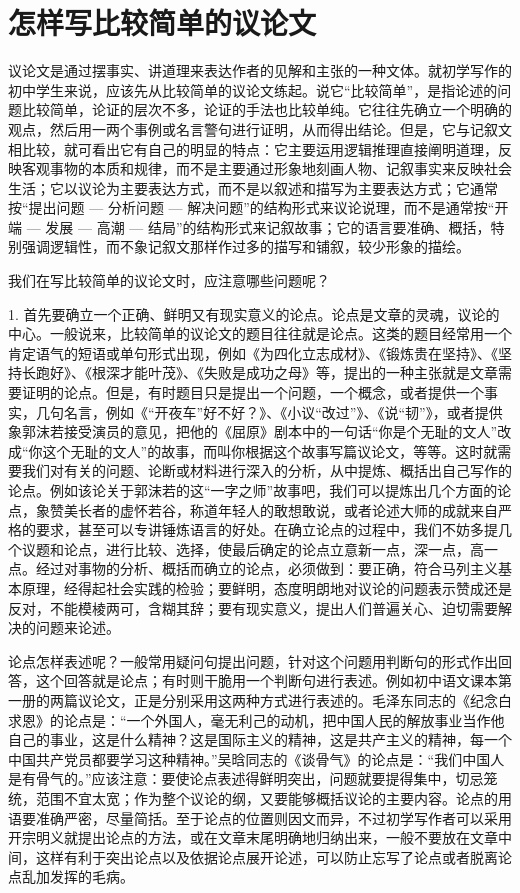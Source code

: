 \section{怎样写比较简单的议论文}

议论文是通过摆事实、讲道理来表达作者的见解和主张的一种文体。就初学写作的初中学生来说，应该先从比较简单的议论文练起。说它“比较简单”，是指论述的问题比较简单，论证的层次不多，论证的手法也比较单纯。它往往先确立一个明确的观点，然后用一两个事例或名言警句进行证明，从而得出结论。但是，它与记叙文相比较，就可看出它有自己的明显的特点：它主要运用逻辑推理直接阐明道理，反映客观事物的本质和规律，而不是主要通过形象地刻画人物、记叙事实来反映社会生活；它以议论为主要表达方式，而不是以叙述和描写为主要表达方式；它通常按“提出问题 --- 分析问题 --- 解决问题”的结构形式来议论说理，而不是通常按“开端 --- 发展 --- 高潮 --- 结局”的结构形式来记叙故事；它的语言要准确、概括，特别强调逻辑性，而不象记叙文那样作过多的描写和铺叙，较少形象的描绘。

我们在写比较简单的议论文时，应注意哪些问题呢？

1. 首先要确立一个正确、鲜明又有现实意义的论点。论点是文章的灵魂，议论的中心。一般说来，比较简单的议论文的题目往往就是论点。这类的题目经常用一个肯定语气的短语或单句形式出现，例如《为四化立志成材》、《锻炼贵在坚持》、《坚持长跑好》、《根深才能叶茂》、《失败是成功之母》等，提出的一种主张就是文章需要证明的论点。但是，有时题目只是提出一个问题，一个概念，或者提供一个事实，几句名言，例如《“开夜车”好不好？》、《小议“改过”》、《说“韧”》，或者提供象郭沫若接受演员的意见，把他的《屈原》剧本中的一句话“你是个无耻的文人”改成“你这个无耻的文人”的故事，而叫你根据这个故事写篇议论文，等等。这时就需要我们对有关的问题、论断或材料进行深入的分析，从中提炼、概括出自己写作的论点。例如该论关于郭沫若的这“一字之师”故事吧，我们可以提炼出几个方面的论点，象赞美长者的虚怀若谷，称道年轻人的敢想敢说，或者论述大师的成就来自严格的要求，甚至可以专讲锤炼语言的好处。在确立论点的过程中，我们不妨多提几个议题和论点，进行比较、选择，使最后确定的论点立意新一点，深一点，高一点。经过对事物的分析、概括而确立的论点，必须做到：要正确，符合马列主义基本原理，经得起社会实践的检验；要鲜明，态度明朗地对议论的问题表示赞成还是反对，不能模棱两可，含糊其辞；要有现实意义，提出人们普遍关心、迫切需要解决的问题来论述。

论点怎样表述呢？一般常用疑问句提出问题，针对这个问题用判断句的形式作出回答，这个回答就是论点；有时则干脆用一个判断句进行表述。例如初中语文课本第一册的两篇议论文，正是分别采用这两种方式进行表述的。毛泽东同志的《纪念白求恩》的论点是：“一个外国人，毫无利己的动机，把中国人民的解放事业当作他自己的事业，这是什么精神？这是国际主义的精神，这是共产主义的精神，每一个中国共产党员都要学习这种精神。”吴晗同志的《谈骨气》的论点是：“我们中国人是有骨气的。”应该注意：要使论点表述得鲜明突出，问题就要提得集中，切忌笼统，范围不宜太宽；作为整个议论的纲，又要能够概括议论的主要内容。论点的用语要准确严密，尽量简括。至于论点的位置则因文而异，不过初学写作者可以采用开宗明义就提出论点的方法，或在文章末尾明确地归纳出来，一般不要放在文章中间，这样有利于突出论点以及依据论点展开论述，可以防止忘写了论点或者脱离论点乱加发挥的毛病。

